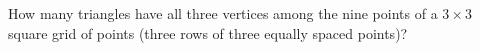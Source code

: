 How many triangles have all three vertices among the nine points of a $3\times3$ square grid of points (three rows of three equally spaced points)?
